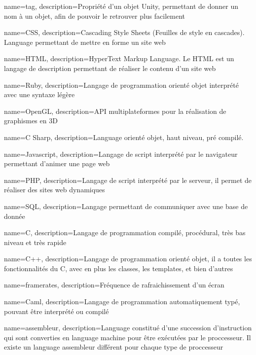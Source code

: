 {
  name=tag,
  description={Propriété d'un objet Unity, permettant de donner un nom à un objet, afin de pouvoir le retrouver plus facilement}
}

{
  name=CSS,
  description={Cascading Style Sheets (Feuilles de style en cascades). Language permettant de mettre en forme un site web}
}

{
  name=HTML,
  description={HyperText Markup Language. Le HTML est un langage de description permettant de réaliser le contenu d'un site web}
}

{
  name=Ruby,
  description={Langage de programmation orienté objet interprété avec une syntaxe légère}
}

{
  name=OpenGL,
  description={API multiplateformes pour la réalisation de graphismes en 3D}
}

{
  name=C Sharp,
  description={Language orienté objet, haut niveau, pré compilé.}
}

{
  name=Javascript,
  description={Langage de script interprété par le navigateur permettant d'animer une page web}
}

{
  name=PHP,
  description={Langage de script interprété par le serveur, il permet de réaliser des sites web dynamiques}
}

{
  name=SQL,
  description={Langage permettant de communiquer avec une base de donnée}
}

{
  name=C,
  description={Langage de programmation compilé, procédural, très bas niveau et très rapide}
}

{
  name=C++,
  description={Langage de programmation orienté objet, il a toutes les fonctionnalités du C, avec en plus les classes, les templates, et bien d'autres}
}

{
  name=framerates,
  description={Fréquence de rafraichissement d'un écran}
}

{
  name=Caml,
  description={Langage de programmation automatiquement typé, pouvant être interprété ou compilé}
}

{
  name=assembleur,
  description={Language constitué d'une succession d'instruction qui sont converties en language machine pour être exécutées par le proccesseur. Il existe un language assembleur différent pour chaque type de proccesseur}
}

